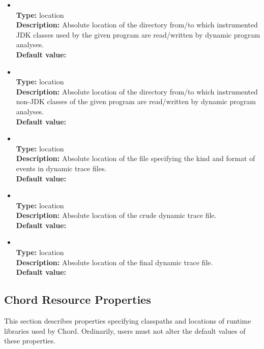 \begin{itemize}
\item
{} \\
{\bf Type:} location \\
{\bf Description:} Absolute location of the directory from/to which instrumented JDK classes used by the given program are read/written by dynamic program analyses. \\
{\bf Default value:}  

\item
{} \\
{\bf Type:} location \\
{\bf Description:} Absolute location of the directory from/to which instrumented non-JDK classes of the given program are read/written by dynamic program analyses. \\
{\bf Default value:}  

\item
{} \\
{\bf Type:} location \\
{\bf Description:} Absolute location of the file specifying the kind and format of events in dynamic trace files. \\
{\bf Default value:} 

\item
{} \\
{\bf Type:} location \\
{\bf Description:} Absolute location of the crude dynamic trace file. \\
{\bf Default value:}  

\item
{} \\
{\bf Type:} location \\
{\bf Description:} Absolute location of the final dynamic trace file. \\
{\bf Default value:} 
\end{itemize}

\subsection{Chord Resource Properties}
\label{sec:chord-sysprops:resource}

This section describes properties specifying classpaths and locations of runtime libraries used by Chord.
Ordinarily, users must not alter the default values of these properties.

